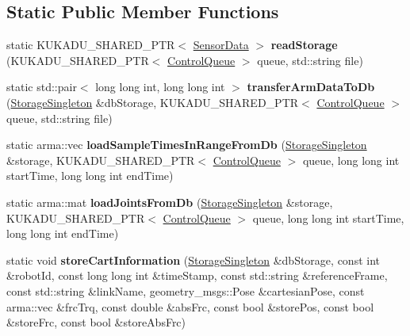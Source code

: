 \subsection*{Static Public Member Functions}
\begin{DoxyCompactItemize}
\item 
static K\+U\+K\+A\+D\+U\+\_\+\+S\+H\+A\+R\+E\+D\+\_\+\+P\+TR$<$ \hyperlink{classkukadu_1_1SensorData}{Sensor\+Data} $>$ {\bfseries read\+Storage} (K\+U\+K\+A\+D\+U\+\_\+\+S\+H\+A\+R\+E\+D\+\_\+\+P\+TR$<$ \hyperlink{classkukadu_1_1ControlQueue}{Control\+Queue} $>$ queue, std\+::string file)\hypertarget{classkukadu_1_1SensorStorage_a670a757897a4f1f0008b4f877dc8480e}{}\label{classkukadu_1_1SensorStorage_a670a757897a4f1f0008b4f877dc8480e}

\item 
static std\+::pair$<$ long long int, long long int $>$ {\bfseries transfer\+Arm\+Data\+To\+Db} (\hyperlink{classkukadu_1_1StorageSingleton}{Storage\+Singleton} \&db\+Storage, K\+U\+K\+A\+D\+U\+\_\+\+S\+H\+A\+R\+E\+D\+\_\+\+P\+TR$<$ \hyperlink{classkukadu_1_1ControlQueue}{Control\+Queue} $>$ queue, std\+::string file)\hypertarget{classkukadu_1_1SensorStorage_aff22f604c185d8de12753f044a699695}{}\label{classkukadu_1_1SensorStorage_aff22f604c185d8de12753f044a699695}

\item 
static arma\+::vec {\bfseries load\+Sample\+Times\+In\+Range\+From\+Db} (\hyperlink{classkukadu_1_1StorageSingleton}{Storage\+Singleton} \&storage, K\+U\+K\+A\+D\+U\+\_\+\+S\+H\+A\+R\+E\+D\+\_\+\+P\+TR$<$ \hyperlink{classkukadu_1_1ControlQueue}{Control\+Queue} $>$ queue, long long int start\+Time, long long int end\+Time)\hypertarget{classkukadu_1_1SensorStorage_ab5bc70de1543ef34b89789274d4fa645}{}\label{classkukadu_1_1SensorStorage_ab5bc70de1543ef34b89789274d4fa645}

\item 
static arma\+::mat {\bfseries load\+Joints\+From\+Db} (\hyperlink{classkukadu_1_1StorageSingleton}{Storage\+Singleton} \&storage, K\+U\+K\+A\+D\+U\+\_\+\+S\+H\+A\+R\+E\+D\+\_\+\+P\+TR$<$ \hyperlink{classkukadu_1_1ControlQueue}{Control\+Queue} $>$ queue, long long int start\+Time, long long int end\+Time)\hypertarget{classkukadu_1_1SensorStorage_a3f62ddfb05e9393838839d46f56b5f45}{}\label{classkukadu_1_1SensorStorage_a3f62ddfb05e9393838839d46f56b5f45}

\item 
static void {\bfseries store\+Cart\+Information} (\hyperlink{classkukadu_1_1StorageSingleton}{Storage\+Singleton} \&db\+Storage, const int \&robot\+Id, const long long int \&time\+Stamp, const std\+::string \&reference\+Frame, const std\+::string \&link\+Name, geometry\+\_\+msgs\+::\+Pose \&cartesian\+Pose, const arma\+::vec \&frc\+Trq, const double \&abs\+Frc, const bool \&store\+Pos, const bool \&store\+Frc, const bool \&store\+Abs\+Frc)\hypertarget{classkukadu_1_1SensorStorage_af0fb0408bf923c99dda182a50783cf1b}{}\label{classkukadu_1_1SensorStorage_af0fb0408bf923c99dda182a50783cf1b}


\end{DoxyCompactItemize}
